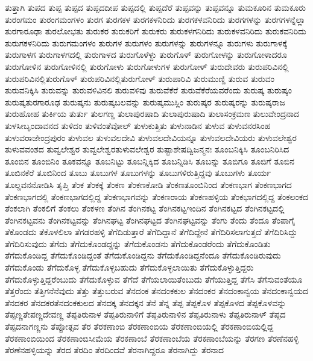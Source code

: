 {ತುತ್ತಾಗಿ
ತುಪದ
ತುಪ್ಪ
ತುಪ್ಪದ
ತುಪ್ಪದದೀಪ
ತುಪ್ಪದಲ್ಲಿ
ತುಪ್ಪದೆರೆ
ತುಪ್ಪವನ್ನು
ತುಪ್ಪವನ್ನೂ
ತುಮಕೂರಿನ
ತುಮಕೂರು
ತುರಂಗಮಂ
ತುರಂಗಮಂಗಳಂ
ತುರಗ
ತುರಗಕಳ
ತುರಗಕಳನಿರಿದು
ತುರಗಕಳವನಿರಿದು
ತುರಗಗಳನ್ನು
ತುರಗಗಳನ್ನೆಲ್ಲಾ
ತುರಗಾರೂಢಾ
ತುರಲೋಭತು
ತುರುಕರ
ತುರುಕರಿಗೆ
ತುರುಕರು
ತುರುಕಳಗನಿರಿದು
ತುರುಕಳವನಿರಿದು
ತುರುಕವನಿರಿದು
ತುರುಗಕಳನಿರಿದು
ತುರುಗಮಂಗಳಂ
ತುರುಗಳ
ತುರುಗಳಂ
ತುರುಗಳನ್ನು
ತುರುಗಳನ್ನೂ
ತುರುಗಳು
ತುರುಗಾಳಕ್ಕೆ
ತುರುಗಾಳಗ
ತುರುಗಾಳಗದಲ್ಲಿ
ತುರುಗಾಳದ
ತುರುಗೊಳೆಳ್ದು
ತುರುಗೊಳ್
ತುರುಗೋಳನ್ನು
ತುರುಗೋಳಾದರೂ
ತುರುಗೋಳಿನ
ತುರುಗೋಳಿನಲ್ಲಿ
ತುರುಗೋಳು
ತುರುಗೋಳುಗಳ
ತುರುಗೋಳ್
ತುರುದೇವರು
ತುರುಪರಿವಿನಲ್ಲಿ
ತುರುಪರಿವಿನಲ್ಲಿತುರುಗೊಳ್
ತುರುಪರಿವಿನಲ್ಲಿತುರುಗೋಳ್
ತುರುಪಾರಿವಿ
ತುರುಮುಣ್ಡಿ
ತುರುವ
ತುರುವಂ
ತುರುವನಿಕ್ಕಿಸಿ
ತುರುವನ್ನು
ತುರುವಳಿವಿನಲಿ
ತುರುವಳಿವು
ತುರುವೆಕೆರೆ
ತುರುವೆಕೆರೆಯವರೆಂದು
ತುರುಷ್ಕ
ತುರುಷ್ಕಂ
ತುರುಷ್ಕತುರಗಾರೂಢ
ತುರುಷ್ಕನು
ತುರುಷ್ಕಬಲವನ್ನು
ತುರುಷ್ಕಮುಸ್ಲಿಂ
ತುರುಷ್ಕರ
ತುರುಷ್ಕರನ್ನು
ತುರುಷ್ಕರಾಜ
ತುರುಹೋಹ
ತುರ್ಕಿಯ
ತುರ್ತು
ತುಲಗಣ್ಡ
ತುಲಾಪುರಷಾದಿ
ತುಲಾಪುರುಷಾದಿ
ತುಲಾಸಂಕ್ರಮಣ
ತುಲುವೇಂದ್ರನಾದ
ತುಳಸೀಬೃಂದಾವನದ
ತುಳಿದಂ
ತುಳಿವಂತೆವೋಲ್
ತುಳುಕುತ್ತಿತು
ತುಳುನಾಡಿನ
ತುಳುವ
ತುಳುವನರಸಿಂಹ
ತುಳುವರಾಜೇಂದ್ರಪುರಂ
ತುಳುವಲ
ತುಳುವಲದೇವಿ
ತುಳುವಲದೇವಿಯನ್ನೂ
ತುಳುವಲದೇವಿಯರು
ತುಳುವಲೇಶ್ವರ
ತುಳುವವಂಶದ
ತುವ್ವಲೇಶ್ವರ
ತುವ್ವಲೇಶ್ವರತುಳುವಲೇಶ್ವರ
ತುಷ್ಟಾಶೇಷದ್ವಿಜನ್ಮನಃ
ತೂಂಬನಿಕ್ಕಿಸಿ
ತೂಂಬನಿರಿಸಿದ
ತೂಂಬಿನ
ತೂಂಬಿನಿಂ
ತೂಕವನ್ನೂ
ತೂಬನಿಟ್ಟು
ತೂಬನ್ನಿಕ್ಕಿದ
ತೂಬನ್ನಿಡಿಸಿ
ತೂಬನ್ನು
ತೂಬಿಗೂ
ತೂಬಿಗೆ
ತೂಬಿನ
ತೂಬಿನಕೆರೆ
ತೂಬಿನಿಂದ
ತೂಬು
ತೂಬುಗಳ
ತೂಬುಗಳನ್ನು
ತೂಬುಗಳಿರುತ್ತಿದ್ದವು
ತೂಬುಗಳು
ತೂರ್ಯ
ತೂಲ್ದವನನೋಡಿಸಿ
ತೃಪ್ತಿ
ತೆಂಕ
ತೆಂಕಕ್ಕೆ
ತೆಂಕಣ
ತೆಂಕಣಕೋಡಿ
ತೆಂಕಣತೂಂಬಿನಿಂದ
ತೆಂಕಣಭಾಗ
ತೆಂಕಣಭಾಗದ
ತೆಂಕಣಭಾಗದಲ್ಲಿ
ತೆಂಕಣಭಾಗದಲ್ಲಿದ್ದ
ತೆಂಕಣಭಾಗವನ್ನು
ತೆಂಕಣರಾಯ
ತೆಂಕಣಹಳ್ಳಿಯ
ತೆಂಕಭಾಗದಲ್ಲಿದ್ದ
ತೆಂಕಲಂಕದ
ತೆಂಕಲಾಗಿ
ತೆಂಕಲಿಗೆ
ತೆಂಕಲು
ತೆಂಕಳಣ
ತೆಂಗಿನ
ತೆಂಗಿನಕಟ್ಟ
ತೆಂಗಿನಕಟ್ಟಇಂದಿನ
ತೆಂಗಿನಕಟ್ಟದ
ತೆಂಗಿನಕಟ್ಟದಲ್ಲಿ
ತೆಂಗಿನಕಟ್ಟವನು
ತೆಂಗಿನಕಟ್ಟವನ್ನು
ತೆಂಗಿನಘಟ್ಟ
ತೆಂಗಿನಘಟ್ಟದ
ತೆಂಗಿನಘಟ್ಟವನ್ನು
ತೆಂಗು
ತೆಂದು
ತೆಂದೂ
ತೆಂಪಾಗೈ
ತೆಕೊಂಡದು
ತೆಕೊಳಲಿಲಾ
ತೆಗಡರಹಳ್ಳಿ
ತೆಗೆದಿಡುತ್ತಾರೆ
ತೆಗೆದಿದ್ದಾನೆ
ತೆಗೆದಿದ್ದೇನೆ
ತೆಗೆದಿರಿಸಲಾಗುತ್ತದೆ
ತೆಗೆದಿರಿಸಿದ್ದು
ತೆಗೆದಿರಿಸುವುದು
ತೆಗೆದು
ತೆಗೆದುಕೊಂಡದ್ದನ್ನು
ತೆಗೆದುಕೊಂಡನು
ತೆಗೆದುಕೊಂಡರೆಂದು
ತೆಗೆದುಕೊಂಡಿತು
ತೆಗೆದುಕೊಂಡಿದ್ದ
ತೆಗೆದುಕೊಂಡಿದ್ದಂತೆ
ತೆಗೆದುಕೊಂಡಿದ್ದನು
ತೆಗೆದುಕೊಂಡಿದ್ದನೆಂದೂ
ತೆಗೆದುಕೊಂಡಿರುವುದು
ತೆಗೆದುಕೊಂಡು
ತೆಗೆದುಕೊಳ್ಳ
ತೆಗೆದುಕೊಳ್ಳಬಹುದು
ತೆಗೆದುಕೊಳ್ಳಲಾಯಿತು
ತೆಗೆದುಕೊಳ್ಳುತ್ತಿದ್ದರು
ತೆಗೆದುಕೊಳ್ಳುತ್ತಿದ್ದರೆಂಬುದು
ತೆಗೆದುಕೊಳ್ಳುವ
ತೆಗೆದೆ
ತೆಗೆಯಲಾಯಿತೆಂಬುದು
ತೆಗೆಯುತ್ತಿದ್ದ
ತೆಗೆಸಿ
ತೆಗೆಸುವಂತೆಯೂ
ತೆತ್ತರೆಂದು
ತೆತ್ತಿಗನೆನೆವುದು
ತೆತ್ತು
ತೆತ್ತುಬರುವ
ತೆನದಂಕ
ತೆನದಂಕಕುಲ
ತೆನದಂಕರ
ತೆನದಂಕಾನ್ವಯ
ತೆನದಂಕಾನ್ವಯದ
ತೆನದಕರ
ತೆನದಕರತೆನದಂಕಕುಲದ
ತೆನದಕ್ಕ
ತೆನದಕ್ಕನ
ತೆನೆ
ತೆನ್ನ
ತೆಪ್ಪ
ತೆಪ್ಪಕೊಳ
ತೆಪ್ಪಕೊಳದ
ತೆಪ್ಪಕೊಳವನ್ನು
ತೆಪ್ಪಣ್ಣತೇಪಣ್ಣದೇವಣ್ಣ
ತೆಪ್ಪತಿರುನಾಳ
ತೆಪ್ಪತಿರುನಾಳಿಗೆ
ತೆಪ್ಪತಿರುನಾಳಿನ
ತೆಪ್ಪತಿರುನಾಳು
ತೆಪ್ಪತಿರುನಾಳ್
ತೆಪ್ಪದ
ತೆಪ್ಪದನಾಗಣ್ಣನು
ತೆಪ್ಪೋತ್ಸವ
ತೆರ
ತೆರಕಣಾಂಬಿ
ತೆರಕಣಾಂಬಿಯ
ತೆರಕಣಾಂಬಿಯಲ್ಲಿ
ತೆರಕಣಾಂಬಿಯಲ್ಲಿದ್ದ
ತೆರಕಣಾಂಬಿಯಿಂದ
ತೆರಕಣಾಂಬಿಸೀಮೆಯ
ತೆರಕಣಾಂಬೆ
ತೆರಕಣಾಂಬೆಯ
ತೆರಕಣಾಂಬೆಯನ್ನು
ತೆರಗಣ
ತೆರಣೆನಹಳ್ಳಿ
ತೆರಣೆನಹಳ್ಳಿಯನ್ನು
ತೆರದ
ತೆರದಿಂ
ತೆರದಿಂದವೆ
ತೆರನಾಗಿದ್ದರೂ
ತೆರನಾಗಿದ್ದು
ತೆರನಾದ
}
